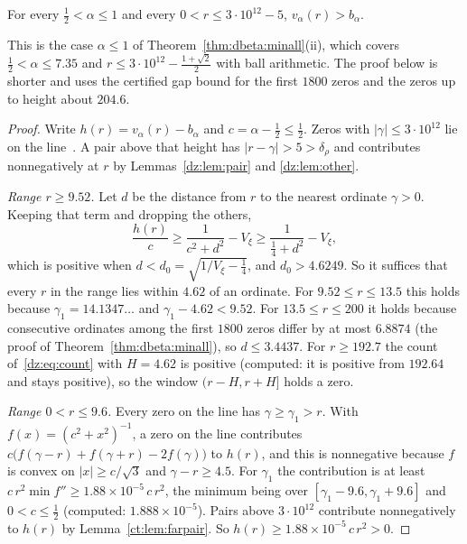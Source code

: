 \begin{theorem}\label{dz:thm:low}
For every $\frac12<\alpha\le1$ and every $0<r\le3\cdot10^{12}-5$, $v_\alpha(r)>b_\alpha$.
\end{theorem}
This is the case $\alpha\le1$ of Theorem~\ref{thm:dbeta:minall}(ii), which covers $\frac12<\alpha\le7.35$ and $r\le3\cdot10^{12}-\frac{1+\sqrt2}2$ with ball arithmetic. The proof below is shorter and uses the certified gap bound for the first $1800$ zeros and the zeros up to height about $204.6$.
\begin{proof}
Write $h(r)=v_\alpha(r)-b_\alpha$ and $c=\alpha-\frac12\le\frac12$. Zeros with $|\gamma|\le3\cdot10^{12}$ lie on the line~\cite{PT21}. A pair above that height has $|r-\gamma|>5>\delta_\rho$ and contributes nonnegatively at $r$ by Lemmas~\ref{dz:lem:pair} and \ref{dz:lem:other}.

\emph{Range $r\ge9.52$.} Let $d$ be the distance from $r$ to the nearest ordinate $\gamma>0$. Keeping that term and dropping the others,
\[
\frac{h(r)}c\ge\frac1{c^2+d^2}-V_\xi\ge\frac1{\frac14+d^2}-V_\xi,
\]
which is positive when $d<d_0=\sqrt{1/V_\xi-\frac14}$, and $d_0>4.6249$. So it suffices that every $r$ in the range lies within $4.62$ of an ordinate. For $9.52\le r\le13.5$ this holds because $\gamma_1=14.1347\ldots$ and $\gamma_1-4.62<9.52$. For $13.5\le r\le200$ it holds because consecutive ordinates among the first $1800$ zeros differ by at most $6.8874$ (the proof of Theorem~\ref{thm:dbeta:minall}), so $d\le3.4437$. For $r\ge192.7$ the count of~\eqref{dz:eq:count} with $H=4.62$ is positive (computed: it is positive from $192.64$ and stays positive), so the window $(r-H,r+H]$ holds a zero.

\emph{Range $0<r\le9.6$.} Every zero on the line has $\gamma\ge\gamma_1>r$. With $f(x)=(c^2+x^2)^{-1}$, a zero on the line contributes $c\big(f(\gamma-r)+f(\gamma+r)-2f(\gamma)\big)$ to $h(r)$, and this is nonnegative because $f$ is convex on $|x|\ge c/\sqrt3$ and $\gamma-r\ge4.5$. For $\gamma_1$ the contribution is at least $c\,r^2\min f''\ge1.88\times10^{-5}\,c\,r^2$, the minimum being over $[\gamma_1-9.6,\gamma_1+9.6]$ and $0<c\le\frac12$ (computed: $1.888\times10^{-5}$). Pairs above $3\cdot10^{12}$ contribute nonnegatively to $h(r)$ by Lemma~\ref{ct:lem:farpair}. So $h(r)\ge1.88\times10^{-5}\,c\,r^2>0$.
\end{proof}

